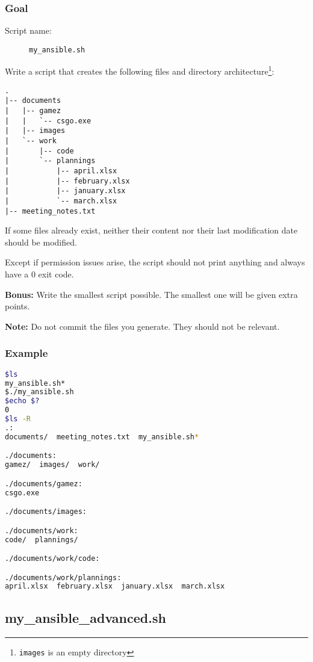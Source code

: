 \documentclass[12pt]{article}
\begin{document}
\subsubsection{Goal}

\begin{description}
    \item[Script name:] \texttt{my\_ansible.sh}
\end{description}

Write a script that creates the following files and directory architecture\footnote{\texttt{images} is an empty directory}:

\begin{lstlisting}
.
|-- documents
|   |-- gamez
|   |   `-- csgo.exe
|   |-- images
|   `-- work
|       |-- code
|       `-- plannings
|           |-- april.xlsx
|           |-- february.xlsx
|           |-- january.xlsx
|           `-- march.xlsx
|-- meeting_notes.txt
\end{lstlisting}

If some files already exist, neither their content nor their last modification date should be modified.

Except if permission issues arise, the script should not print anything and always have a 0 exit code.

\textbf{Bonus:} Write the smallest script possible. The smallest one will be given extra points.

\textbf{Note:} Do not commit the files you generate. They should not be relevant.

\subsubsection{Example}

\begin{lstlisting}[language=bash]
$ls
my_ansible.sh*
$./my_ansible.sh
$echo $?
0
$ls -R
.:
documents/  meeting_notes.txt  my_ansible.sh*

./documents:
gamez/  images/  work/

./documents/gamez:
csgo.exe

./documents/images:

./documents/work:
code/  plannings/

./documents/work/code:

./documents/work/plannings:
april.xlsx  february.xlsx  january.xlsx  march.xlsx
\end{lstlisting}

\subsection{my\_ansible\_advanced.sh}
\end{document}
